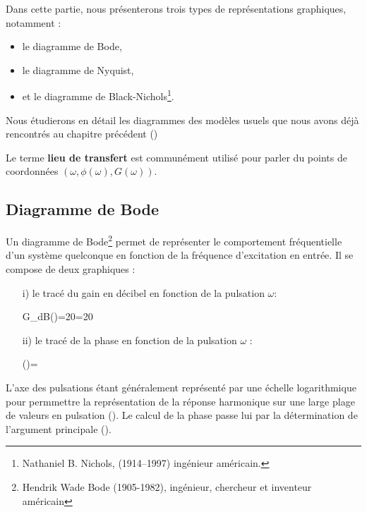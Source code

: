 Dans cette partie, nous présenterons trois types de représentations graphiques, notamment :
\begin{itemize}
    \item le diagramme de Bode,
    \item le diagramme de Nyquist,
    \item et le diagramme de Black-Nichols\footnote{Nathaniel B. Nichols, (1914–1997) ingénieur américain.}. 
\end{itemize}
Nous étudierons en détail les diagrammes des 
modèles usuels que nous avons déjà rencontrés 
au chapitre précédent ()

Le terme \textbf{lieu de transfert} est communément utilisé pour parler du 
points de coordonnées $(\omega, \phi(\omega),G(\omega))$.


\subsection{Diagramme de Bode}

Un diagramme de Bode\footnote{Hendrik Wade Bode (1905-1982), ingénieur, chercheur 
et inventeur américain} permet de représenter le comportement fréquentielle 
d'un système quelconque en fonction de la fréquence d'excitation en entrée.
Il se compose de deux graphiques :
\begin{itemize}
    \item[i)] le tracé du gain en décibel en fonction de la pulsation $\omega$:
        \begin{bequation} 
        G_{dB}(\omega)=20=20 
        \end{bequation}
    \item[ii)] le tracé de la phase en fonction de la pulsation $\omega$ :
        \begin{bequation} 
        \phi(\omega)=
        \end{bequation}
\end{itemize}
L'axe des pulsations étant généralement représenté par une échelle logarithmique 
pour permmettre la représentation de la réponse harmonique sur une large plage de valeurs en pulsation
(). Le calcul de la phase passe lui par la détermination 
de l'argument principale ().

